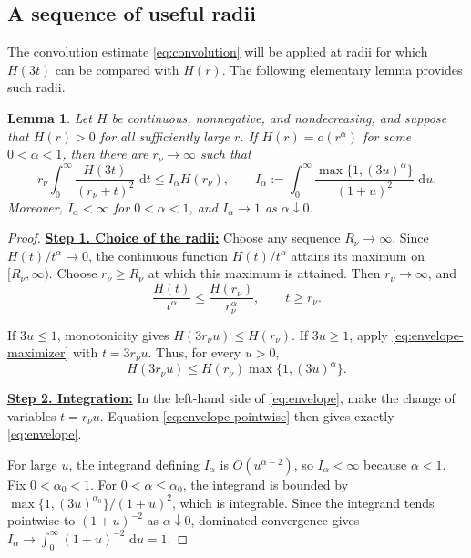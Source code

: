 \documentclass[12pt,letterpaper,reqno]{amsart}
\newtheorem{lem}[thm]{Lemma}
\theoremstyle{definition}
\numberwithin{equation}{section}
\newcommand{\dd}{\,\mathrm d}
\begin{document}
\subsection{A sequence of useful radii}

The convolution estimate \eqref{eq:convolution} will be applied at
radii for which \(H(3t)\) can be compared with \(H(r)\). The following
elementary lemma provides such radii.

\begin{lem}\label{lem:envelope}
Let \(H\) be continuous, nonnegative, and nondecreasing, and suppose
that \(H(r)>0\) for all sufficiently large \(r\). If
\(H(r)=o(r^\alpha)\) for some \(0<\alpha<1\), then there are
\(r_\nu\to\infty\) such that
\begin{equation}\label{eq:envelope}
 r_\nu\int_0^\infty
 \frac{H(3t)}{(r_\nu+t)^2}\,\dd t
 \leq
 I_\alpha H(r_\nu),
 \qquad
 I_\alpha
 :=
 \int_0^\infty
 \frac{\max\{1,(3u)^\alpha\}}{(1+u)^2}\,\dd u.
\end{equation}
Moreover, \(I_\alpha<\infty\) for \(0<\alpha<1\), and
\(I_\alpha\to1\) as \(\alpha\downarrow0\).
\end{lem}

\begin{proof}

\medskip\noindent
\textbf{\underline{Step 1. Choice of the radii:}}
Choose any sequence \(R_\nu\to\infty\). Since
\(H(t)/t^\alpha\to0\), the continuous function
\(H(t)/t^\alpha\) attains its maximum on \([R_\nu,\infty)\).
Choose \(r_\nu\geq R_\nu\) at which this maximum is attained. Then
\(r_\nu\to\infty\), and
\begin{equation}\label{eq:envelope-maximizer}
 \frac{H(t)}{t^\alpha}
 \leq
 \frac{H(r_\nu)}{r_\nu^\alpha},
 \qquad
 t\geq r_\nu.
\end{equation}

If \(3u\leq1\), monotonicity gives
\(H(3r_\nu u)\leq H(r_\nu)\). If \(3u\geq1\), apply
\eqref{eq:envelope-maximizer} with \(t=3r_\nu u\). Thus, for every
\(u>0\),
\begin{equation}\label{eq:envelope-pointwise}
 H(3r_\nu u)
 \leq
 H(r_\nu)\max\{1,(3u)^\alpha\}.
\end{equation}


\medskip\noindent
\textbf{\underline{Step 2. Integration:}}
In the left-hand side of \eqref{eq:envelope}, make the change of
variables \(t=r_\nu u\). Equation
\eqref{eq:envelope-pointwise} then gives exactly
\eqref{eq:envelope}.

For large \(u\), the integrand defining \(I_\alpha\) is
\(O(u^{\alpha-2})\), so \(I_\alpha<\infty\) because \(\alpha<1\).
Fix \(0<\alpha_0<1\). For \(0<\alpha\leq\alpha_0\), the integrand is
bounded by
\(\max\{1,(3u)^{\alpha_0}\}/(1+u)^2\), which is integrable. Since the
integrand tends pointwise to \((1+u)^{-2}\) as \(\alpha\downarrow0\),
dominated convergence gives
\(I_\alpha\to\int_0^\infty(1+u)^{-2}\,\dd u=1\).
\end{proof}
\end{document}
